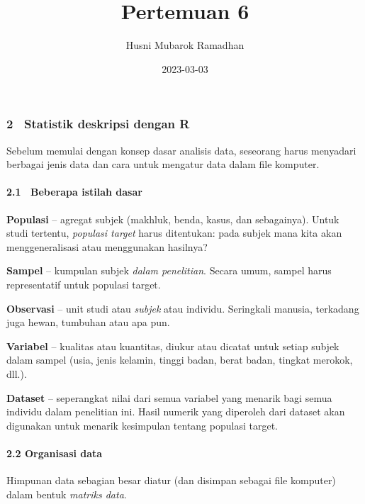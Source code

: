 \documentclass[
]{article}
\title{Pertemuan 6}
\author{Husni Mubarok Ramadhan}
\date{2023-03-03}
\begin{document}
\maketitle

\hypertarget{statistik-deskripsi-dengan-r}{%
\subsubsection{\texorpdfstring{\textbf{2~ Statistik deskripsi dengan
R}}{2~ Statistik deskripsi dengan R}}\label{statistik-deskripsi-dengan-r}}

Sebelum memulai dengan konsep dasar analisis data, seseorang harus
menyadari berbagai jenis data dan cara untuk mengatur data dalam file
komputer.

\hypertarget{beberapa-istilah-dasar}{%
\paragraph{\texorpdfstring{\textbf{2.1~ Beberapa istilah
dasar}}{2.1~ Beberapa istilah dasar}}\label{beberapa-istilah-dasar}}

\textbf{Populasi} -- agregat subjek (makhluk, benda, kasus, dan
sebagainya). Untuk studi tertentu, \emph{populasi target} harus
ditentukan: pada subjek mana kita akan menggeneralisasi atau menggunakan
hasilnya?

\textbf{Sampel} -- kumpulan subjek \emph{dalam penelitian}. Secara umum,
sampel harus representatif untuk populasi target.

\textbf{Observasi} -- unit studi atau \emph{subjek} atau individu.
Seringkali manusia, terkadang juga hewan, tumbuhan atau apa pun.

\textbf{Variabel} -- kualitas atau kuantitas, diukur atau dicatat untuk
setiap subjek dalam sampel (usia, jenis kelamin, tinggi badan, berat
badan, tingkat merokok, dll.).

\textbf{Dataset} -- seperangkat nilai dari semua variabel yang menarik
bagi semua individu dalam penelitian ini. Hasil numerik yang diperoleh
dari dataset akan digunakan untuk menarik kesimpulan tentang populasi
target.

\hypertarget{organisasi-data}{%
\paragraph{\texorpdfstring{\textbf{2.2 Organisasi
data}}{2.2 Organisasi data}}\label{organisasi-data}}

Himpunan data sebagian besar diatur (dan disimpan sebagai file komputer)
dalam bentuk \emph{matriks data}.
\end{document}
